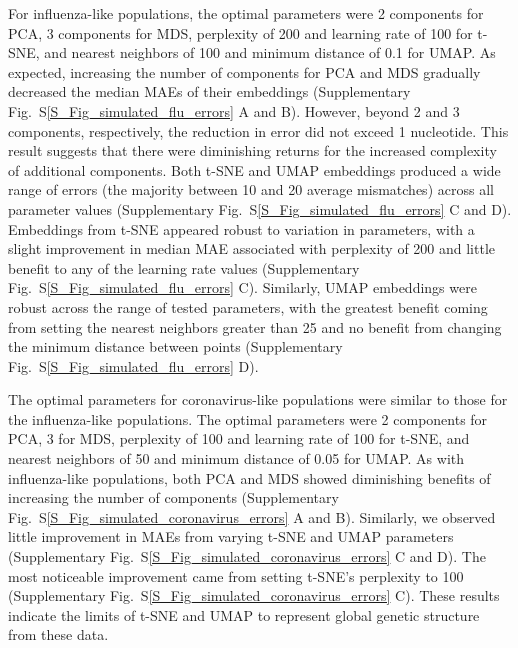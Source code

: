 \documentclass[webpdf,contemporary,large,single]{oup-authoring-template}%
\theoremstyle{thmstyleone}%
\theoremstyle{thmstyletwo}%
\theoremstyle{thmstylethree}%
\begin{document}
For influenza-like populations, the optimal parameters were 2 components for PCA, 3 components for MDS, perplexity of 200 and learning rate of 100 for t-SNE, and nearest neighbors of 100 and minimum distance of 0.1 for UMAP.
As expected, increasing the number of components for PCA and MDS gradually decreased the median MAEs of their embeddings (Supplementary Fig.~S\ref{S_Fig_simulated_flu_errors} A and B).
However, beyond 2 and 3 components, respectively, the reduction in error did not exceed 1 nucleotide.
This result suggests that there were diminishing returns for the increased complexity of additional components.
Both t-SNE and UMAP embeddings produced a wide range of errors (the majority between 10 and 20 average mismatches) across all parameter values (Supplementary Fig.~S\ref{S_Fig_simulated_flu_errors} C and D).
Embeddings from t-SNE appeared robust to variation in parameters, with a slight improvement in median MAE associated with perplexity of 200 and little benefit to any of the learning rate values (Supplementary Fig.~S\ref{S_Fig_simulated_flu_errors} C).
Similarly, UMAP embeddings were robust across the range of tested parameters, with the greatest benefit coming from setting the nearest neighbors greater than 25 and no benefit from changing the minimum distance between points (Supplementary Fig.~S\ref{S_Fig_simulated_flu_errors} D).

The optimal parameters for coronavirus-like populations were similar to those for the influenza-like populations.
The optimal parameters were 2 components for PCA, 3 for MDS, perplexity of 100 and learning rate of 100 for t-SNE, and nearest neighbors of 50 and minimum distance of 0.05 for UMAP.
As with influenza-like populations, both PCA and MDS showed diminishing benefits of increasing the number of components (Supplementary Fig.~S\ref{S_Fig_simulated_coronavirus_errors} A and B).
Similarly, we observed little improvement in MAEs from varying t-SNE and UMAP parameters (Supplementary Fig.~S\ref{S_Fig_simulated_coronavirus_errors} C and D).
The most noticeable improvement came from setting t-SNE's perplexity to 100 (Supplementary Fig.~S\ref{S_Fig_simulated_coronavirus_errors} C).
These results indicate the limits of t-SNE and UMAP to represent global genetic structure from these data.
\end{document}

